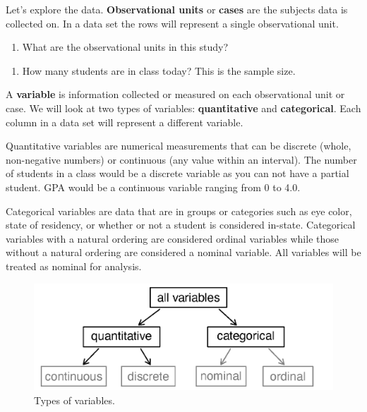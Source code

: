 \documentclass[
]{report}
\providecommand{\tightlist}{%
  \setlength{\itemsep}{0pt}\setlength{\parskip}{0pt}}
\begin{document}
Let's explore the data.
\textbf{Observational units} or \textbf{cases} are the subjects data is collected on. In a data set the rows will represent a single observational unit.

\begin{enumerate}
\def\labelenumi{\arabic{enumi}.}
\tightlist
\item
  What are the observational units in this study?
\end{enumerate}

\vspace{0.5in}

\begin{enumerate}
\def\labelenumi{\arabic{enumi}.}
\setcounter{enumi}{1}
\tightlist
\item
  How many students are in class today? This is the sample size.
\end{enumerate}

\newpage

A \textbf{variable} is information collected or measured on each observational unit or case. We will look at two types of variables: \textbf{quantitative} and \textbf{categorical}. Each column in a data set will represent a different variable.

Quantitative variables are numerical measurements that can be discrete (whole, non-negative numbers) or continuous (any value within an interval). The number of students in a class would be a discrete variable as you can not have a partial student. GPA would be a continuous variable ranging from 0 to 4.0.

Categorical variables are data that are in groups or categories such as eye color, state of residency, or whether or not a student is considered in-state. Categorical variables with a natural ordering are considered ordinal variables while those without a natural ordering are considered a nominal variable. All variables will be treated as nominal for analysis.

\begin{figure}

{\centering \includegraphics[width=0.75\linewidth]{images/variables} 

}

\caption{Types of variables.}\label{fig:unnamed-chunk-1}
\end{figure}
\end{document}
